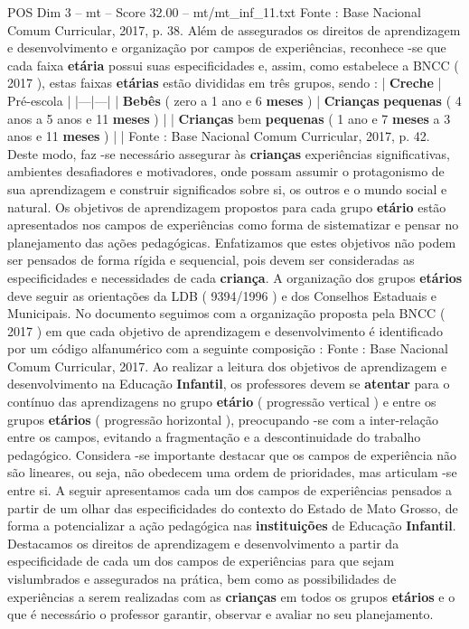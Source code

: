 \begin{textsample}{POS Dim 3 – mt – Score 32.00 – mt/mt\_inf\_11.txt}
Fonte : Base Nacional Comum Curricular, 2017, p. 38.
Além de assegurados os direitos de aprendizagem e desenvolvimento e organização por campos de experiências, reconhece -se que cada faixa \textbf{etária} possui suas especificidades e, assim, como estabelece a BNCC ( 2017 ), estas faixas \textbf{etárias} estão divididas em três grupos, sendo : | \textbf{Creche} | Pré-escola | |---|---| | \textbf{Bebês} ( zero a 1 ano e 6 \textbf{meses} ) | \textbf{Crianças} \textbf{pequenas} ( 4 anos a 5 anos e 11 \textbf{meses} ) | | \textbf{Crianças} bem \textbf{pequenas} ( 1 ano e 7 \textbf{meses} a 3 anos e 11 \textbf{meses} ) | | Fonte : Base Nacional Comum Curricular, 2017, p. 42.
Deste modo, faz -se necessário assegurar às \textbf{crianças} experiências significativas, ambientes desafiadores e motivadores, onde possam assumir o protagonismo de sua aprendizagem e construir significados sobre si, os outros e o mundo social e natural.
Os objetivos de aprendizagem propostos para cada grupo \textbf{etário} estão apresentados nos campos de experiências como forma de sistematizar e pensar no planejamento das ações pedagógicas.
Enfatizamos que estes objetivos não podem ser pensados de forma rígida e sequencial, pois devem ser consideradas as especificidades e necessidades de cada \textbf{criança}.
A organização dos grupos \textbf{etários} deve seguir as orientações da LDB ( 9394/1996 ) e dos Conselhos Estaduais e Municipais.
No documento seguimos com a organização proposta pela BNCC ( 2017 ) em que cada objetivo de aprendizagem e desenvolvimento é identificado por um código alfanumérico com a seguinte composição : Fonte : Base Nacional Comum Curricular, 2017.
Ao realizar a leitura dos objetivos de aprendizagem e desenvolvimento na Educação \textbf{Infantil}, os professores devem se \textbf{atentar} para o contínuo das aprendizagens no grupo \textbf{etário} ( progressão vertical ) e entre os grupos \textbf{etários} ( progressão horizontal ), preocupando -se com a inter-relação entre os campos, evitando a fragmentação e a descontinuidade do trabalho pedagógico.
Considera -se importante destacar que os campos de experiência não são lineares, ou seja, não obedecem uma ordem de prioridades, mas articulam -se entre si.
A seguir apresentamos cada um dos campos de experiências pensados a partir de um olhar das especificidades do contexto do Estado de Mato Grosso, de forma a potencializar a ação pedagógica nas \textbf{instituições} de Educação \textbf{Infantil}.
Destacamos os direitos de aprendizagem e desenvolvimento a partir da especificidade de cada um dos campos de experiências para que sejam vislumbrados e assegurados na prática, bem como as possibilidades de experiências a serem realizadas com as \textbf{crianças} em todos os grupos \textbf{etários} e o que é necessário o professor garantir, observar e avaliar no seu planejamento.

\end{textsample}
